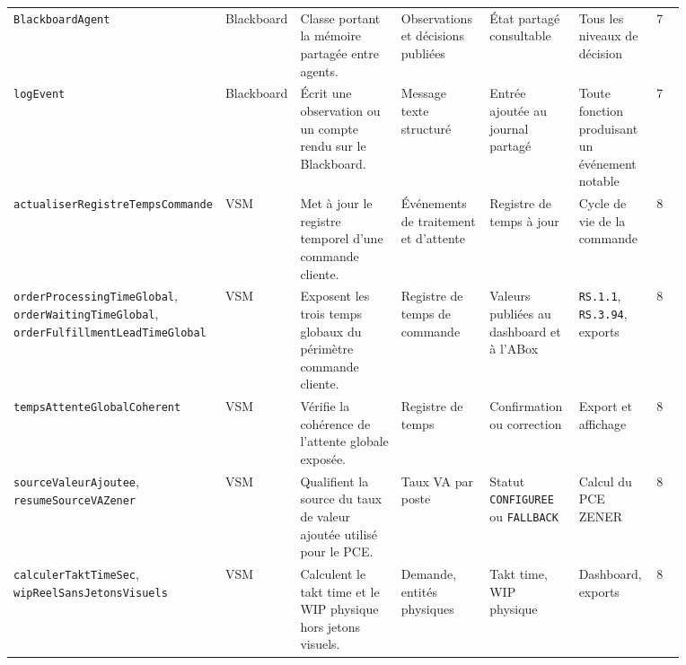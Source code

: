 \begin{landscape}
{\begin{longtable}{L{0.13\linewidth} L{0.09\linewidth} L{0.19\linewidth} L{0.14\linewidth} L{0.14\linewidth} L{0.12\linewidth} L{0.06\linewidth}}
\texttt{Blackboard\allowbreak Agent} & Blackboard & Classe portant la mémoire partagée entre agents. & Observations et décisions publiées & État partagé consultable & Tous les niveaux de décision & 7 \\
\texttt{log\allowbreak Event} & Blackboard & Écrit une observation ou un compte rendu sur le Blackboard. & Message texte structuré & Entrée ajoutée au journal partagé & Toute fonction produisant un événement notable & 7 \\

\texttt{actualiser\allowbreak Registre\allowbreak Temps\allowbreak Commande} & VSM & Met à jour le registre temporel d'une commande cliente. & Événements de traitement et d'attente & Registre de temps à jour & Cycle de vie de la commande & 8 \\
\texttt{order\allowbreak Processing\allowbreak Time\allowbreak Global}, \texttt{order\allowbreak Waiting\allowbreak Time\allowbreak Global}, \texttt{order\allowbreak Fulfillment\allowbreak Lead\allowbreak Time\allowbreak Global} & VSM & Exposent les trois temps globaux du périmètre commande cliente. & Registre de temps de commande & Valeurs publiées au dashboard et à l'ABox & \texttt{RS.1.1}, \texttt{RS.3.94}, exports & 8 \\
\texttt{temps\allowbreak Attente\allowbreak Global\allowbreak Coherent} & VSM & Vérifie la cohérence de l'attente globale exposée. & Registre de temps & Confirmation ou correction & Export et affichage & 8 \\
\texttt{source\allowbreak Valeur\allowbreak Ajoutee}, \texttt{resume\allowbreak Source\allowbreak VAZener} & VSM & Qualifient la source du taux de valeur ajoutée utilisé pour le PCE. & Taux VA par poste & Statut \texttt{CONFIGUREE} ou \texttt{FALLBACK} & Calcul du PCE ZENER & 8 \\
\texttt{calculer\allowbreak Takt\allowbreak Time\allowbreak Sec}, \texttt{wip\allowbreak Reel\allowbreak Sans\allowbreak Jetons\allowbreak Visuels} & VSM & Calculent le takt time et le WIP physique hors jetons visuels. & Demande, entités physiques & Takt time, WIP physique & Dashboard, exports & 8 \\


\end{longtable}}
\end{landscape}
